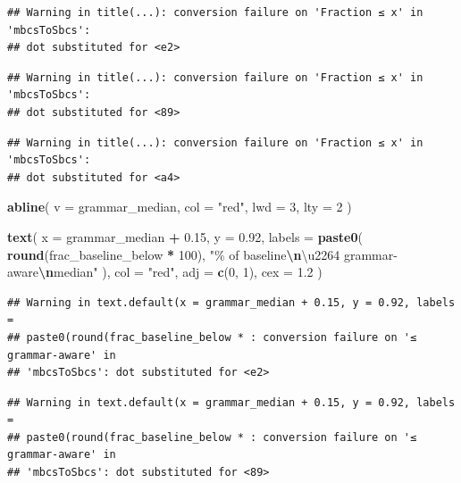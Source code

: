 \documentclass[
]{article}
\newenvironment{Shaded}{\begin{snugshade}}{\end{snugshade}}
\newcommand{\AttributeTok}[1]{\textcolor[rgb]{0.13,0.29,0.53}{#1}}
\newcommand{\DecValTok}[1]{\textcolor[rgb]{0.00,0.00,0.81}{#1}}
\newcommand{\FloatTok}[1]{\textcolor[rgb]{0.00,0.00,0.81}{#1}}
\newcommand{\FunctionTok}[1]{\textcolor[rgb]{0.13,0.29,0.53}{\textbf{#1}}}
\newcommand{\NormalTok}[1]{#1}
\newcommand{\SpecialCharTok}[1]{\textcolor[rgb]{0.81,0.36,0.00}{\textbf{#1}}}
\newcommand{\StringTok}[1]{\textcolor[rgb]{0.31,0.60,0.02}{#1}}
\begin{document}
\begin{verbatim}
## Warning in title(...): conversion failure on 'Fraction ≤ x' in 'mbcsToSbcs':
## dot substituted for <e2>
\end{verbatim}

\begin{verbatim}
## Warning in title(...): conversion failure on 'Fraction ≤ x' in 'mbcsToSbcs':
## dot substituted for <89>
\end{verbatim}

\begin{verbatim}
## Warning in title(...): conversion failure on 'Fraction ≤ x' in 'mbcsToSbcs':
## dot substituted for <a4>
\end{verbatim}

\begin{Shaded}
\begin{Highlighting}[]
\FunctionTok{abline}\NormalTok{(}
  \AttributeTok{v =}\NormalTok{ grammar\_median,}
  \AttributeTok{col =} \StringTok{"red"}\NormalTok{,}
  \AttributeTok{lwd =} \DecValTok{3}\NormalTok{,}
  \AttributeTok{lty =} \DecValTok{2}
\NormalTok{)}

\FunctionTok{text}\NormalTok{(}
  \AttributeTok{x =}\NormalTok{ grammar\_median }\SpecialCharTok{+} \FloatTok{0.15}\NormalTok{,}
  \AttributeTok{y =} \FloatTok{0.92}\NormalTok{,}
  \AttributeTok{labels =} \FunctionTok{paste0}\NormalTok{(}
    \FunctionTok{round}\NormalTok{(frac\_baseline\_below }\SpecialCharTok{*} \DecValTok{100}\NormalTok{),}
    \StringTok{"\% of baseline}\SpecialCharTok{\textbackslash{}n}\StringTok{\textbackslash{}u2264 grammar{-}aware}\SpecialCharTok{\textbackslash{}n}\StringTok{median"}
\NormalTok{  ),}
  \AttributeTok{col =} \StringTok{"red"}\NormalTok{,}
  \AttributeTok{adj =} \FunctionTok{c}\NormalTok{(}\DecValTok{0}\NormalTok{, }\DecValTok{1}\NormalTok{),}
  \AttributeTok{cex =} \FloatTok{1.2}
\NormalTok{)}
\end{Highlighting}
\end{Shaded}

\begin{verbatim}
## Warning in text.default(x = grammar_median + 0.15, y = 0.92, labels =
## paste0(round(frac_baseline_below * : conversion failure on '≤ grammar-aware' in
## 'mbcsToSbcs': dot substituted for <e2>
\end{verbatim}

\begin{verbatim}
## Warning in text.default(x = grammar_median + 0.15, y = 0.92, labels =
## paste0(round(frac_baseline_below * : conversion failure on '≤ grammar-aware' in
## 'mbcsToSbcs': dot substituted for <89>
\end{verbatim}
\end{document}
